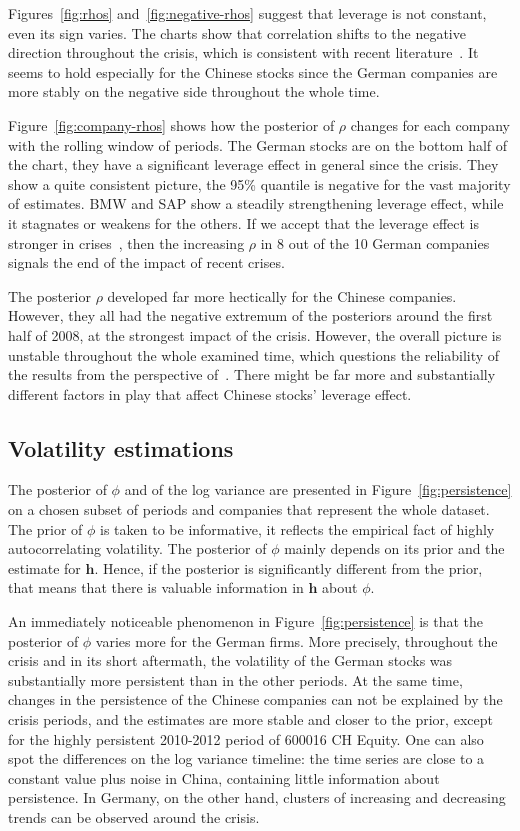Figures~\ref{fig:rhos} and~\ref{fig:negative-rhos} suggest that leverage is not constant, even its sign varies.
The charts show that correlation shifts to the negative direction throughout the crisis, which is consistent with recent literature~\citep{Christensen2015}.
It seems to hold especially for the Chinese stocks since the German companies are more stably on the negative side throughout the whole time.

Figure~\ref{fig:company-rhos} shows how the posterior of $\rho$ changes for each company with the rolling window of periods.
The German stocks are on the bottom half of the chart, they have a significant leverage effect in general since the crisis.
They show a quite consistent picture, the 95\% quantile is negative for the vast majority of estimates.
BMW and SAP show a steadily strengthening leverage effect, while it stagnates or weakens for the others.
If we accept that the leverage effect is stronger in crises~\citep{Christensen2015}, then the increasing $\rho$ in 8 out of the 10 German companies signals the end of the impact of recent crises.

The posterior $\rho$ developed far more hectically for the Chinese companies.
However, they all had the negative extremum of the posteriors around the first half of 2008, at the strongest impact of the crisis.
However, the overall picture is unstable throughout the whole examined time, which questions the reliability of the results from the perspective of~\citet{Christensen2015}.
There might be far more and substantially different factors in play that affect Chinese stocks' leverage effect.

\subsection{Volatility estimations}

The posterior of $\phi$ and of the log variance are presented in Figure~\ref{fig:persistence} on a chosen subset of periods and companies that represent the whole dataset.
The prior of $\phi$ is taken to be informative, it reflects the empirical fact of highly autocorrelating volatility.
The posterior of $\phi$ mainly depends on its prior and the estimate for $\bm h$.
Hence, if the posterior is significantly different from the prior, that means that there is valuable information in $\bm h$ about $\phi$.

An immediately noticeable phenomenon in Figure~\ref{fig:persistence} is that the posterior of $\phi$ varies more for the German firms.
More precisely, throughout the crisis and in its short aftermath, the volatility of the German stocks was substantially more persistent than in the other periods.
At the same time, changes in the persistence of the Chinese companies can not be explained by the crisis periods, and the estimates are more stable and closer to the prior, except for the highly persistent 2010-2012 period of 600016 CH Equity.
One can also spot the differences on the log variance timeline: the time series are close to a constant value plus noise in China, containing little information about persistence.
In Germany, on the other hand, clusters of increasing and decreasing trends can be observed around the crisis.

